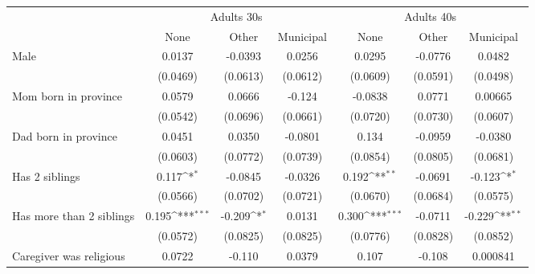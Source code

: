 {
\def\sym#1{\ifmmode^{#1}\else\(^{#1}\)\fi}
\begin{tabular}{l*{6}{c}}
\toprule
&\multicolumn{3}{c}{Adults 30s}&\multicolumn{3}{c}{Adults 40s} \\
                    &\multicolumn{1}{c}{None}&\multicolumn{1}{c}{Other}&\multicolumn{1}{c}{Municipal}&\multicolumn{1}{c}{None}&\multicolumn{1}{c}{Other}&\multicolumn{1}{c}{Municipal}\\
\midrule
Male                &      0.0137         &     -0.0393         &      0.0256         &      0.0295         &     -0.0776         &      0.0482         \\
                    &    (0.0469)         &    (0.0613)         &    (0.0612)         &    (0.0609)         &    (0.0591)         &    (0.0498)         \\
\addlinespace
Mom born in province&      0.0579         &      0.0666         &      -0.124         &     -0.0838         &      0.0771         &     0.00665         \\
                    &    (0.0542)         &    (0.0696)         &    (0.0661)         &    (0.0720)         &    (0.0730)         &    (0.0607)         \\
\addlinespace
Dad born in province&      0.0451         &      0.0350         &     -0.0801         &       0.134         &     -0.0959         &     -0.0380         \\
                    &    (0.0603)         &    (0.0772)         &    (0.0739)         &    (0.0854)         &    (0.0805)         &    (0.0681)         \\
\addlinespace
Has 2 siblings      &       0.117\sym{*}  &     -0.0845         &     -0.0326         &       0.192\sym{**} &     -0.0691         &      -0.123\sym{*}  \\
                    &    (0.0566)         &    (0.0702)         &    (0.0721)         &    (0.0670)         &    (0.0684)         &    (0.0575)         \\
\addlinespace
Has more than 2 siblings&       0.195\sym{***}&      -0.209\sym{*}  &      0.0131         &       0.300\sym{***}&     -0.0711         &      -0.229\sym{**} \\
                    &    (0.0572)         &    (0.0825)         &    (0.0825)         &    (0.0776)         &    (0.0828)         &    (0.0852)         \\
\addlinespace
Caregiver was religious&      0.0722         &      -0.110         &      0.0379         &       0.107         &      -0.108         &    0.000841         \\

\end{tabular}}
